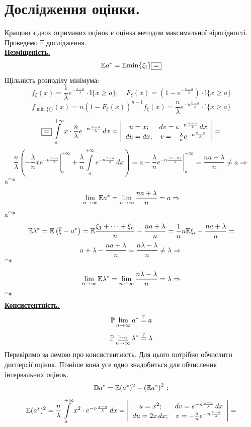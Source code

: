 \documentclass[14pt,a4paper]{scrartcl}
\begin{document}
\newpage
\section{Дослідження оцінки.}

Кращою з двох отриманих оцінок є оцінка методом максимальної вірогідності. Проведемо її дослідження.\\
\underline{\textbf{Незміщеність.}}\\
$$\E {a^*}=\E {\min\{\xi_i\}}\fbox{$=$}$$
Щільність розподілу мінімума:
$$f_\xi(x)=\frac1\lambda e^{-\frac{x-a}\lambda}\cdot\mathbb{I}\{x\geq a\};\quad
F_\xi(x)=(1-e^{-\frac{x-a}\lambda})\cdot\mathbb{I}\{x\geq a\}$$
$$f_{\min\{\xi\}}(x)=n(1-F_\xi(x))^{n-1}f_\xi(x)=
\frac{n}\lambda e^{-n\frac{x-a}{\lambda}}\cdot\mathbb{I}\{x\geq a\}$$
$$\fbox{$=$}\int\limits_{a}^{+\infty}{x\cdot\frac{n}\lambda e^{-n\frac{x-a}{\lambda}}\,dx}=
\left|\begin{array}{cc}
  u=x; & dv=e^{-n\frac{x-a}{\lambda}}\,dx\\
  du=dx; & v=-\frac{\lambda}{n}e^{-n\frac{x-a}{\lambda}}
\end{array}\right|=$$
$$\frac{n}{\lambda}\left(\left.-\frac{\lambda}{n}xe^{-n\frac{x-a}{\lambda}}\right|_a^{+\infty}+\frac{\lambda}{n}\int\limits_{a}^{+\infty}{e^{-n\frac{x-a}{\lambda}}\,dx}\right)=
a-\left.\frac{\lambda}{n}e^{-n\frac{(x-a)}{\lambda}}\right|_a^{+\infty}=
\frac{na+\lambda}n\ne a\Rightarrow$$
\be\Rightarrow a^*\ee
$$\lim\limits_{n\to\infty}{\E a^*}=\lim\limits_{n\to\infty}{\frac{na+\lambda}n}=a\Rightarrow$$
\be\Rightarrow a^*\ee
\\
$$\E \lambda^*=\E \left(\overline{\xi}-a^*\right)=
\E \frac{\xi_1+\dots+\xi_n}n-\frac{na+\lambda}n=
\frac1nn\E \xi_i-\frac{na+\lambda}n=$$
$$a+\lambda-\frac{na+\lambda}n=\frac{n\lambda-\lambda}n\ne\lambda\Rightarrow$$
\be\Rightarrow\lambda^*\ee
$$\lim\limits_{n\to\infty}{\E \lambda^*}=\lim\limits_{n\to\infty}{\frac{n\lambda-\lambda}n}=\lambda\Rightarrow$$
\be\Rightarrow\lambda^*\ee
\newpage\\
\underline{\textbf{Консистентність.}}
$$\P\lim\limits_{n\to\infty}{a^*}\stackrel{?}{=}a$$
$$\P\lim\limits_{n\to\infty}{\lambda^*}\stackrel{?}{=}\lambda$$
Перевіримо за лемою про консистентність. Для цього потрібно обчислити дисперсії оцінок. Пізніше вона усе одно знадобиться для обчислення інтервальних оцінок.
$$\D a^*=\E (a^*)^2-\left(\E a^*\right)^2\,;$$
$$\E (a^*)^2=\frac{n}\lambda\int\limits_{a}^{+\infty}{x^2\cdot e^{-n\frac{x-a}\lambda}\,dx}=
\left|\begin{array}{cc}
  u=x^2; & dv=e^{-n\frac{x-a}\lambda}\,dx\\
  du=2x\,dx; & v=-\frac\lambda{n}e^{-n\frac{x-a}\lambda}
\end{array}\right|=$$
\end{document}
